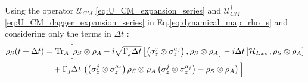 \documentclass[a4paper,12pt]{article}
\begin{document}
	Using the operator $ \mathcal{U}_{CM} $ \ref{eq:U_CM_expansion_series} and $ \mathcal{U}_{CM}^{\dagger} $ \ref{eq:U_CM_dagger_expansion_series} in Eq.\ref{eq:dynamical_map_rho_s} and considering only the terms in $ \Delta t $ :
	\begin{align}
		\rho_{S}(t + \Delta t) &= \text{Tr}_A \Big[ \rho_{S} \otimes \rho_{A} - i \sqrt{\Gamma_j \Delta t} \left[ \left( \sigma_{z}^{j} \otimes \sigma_{z}^{a_j} \right) , \rho_{S} \otimes \rho_{A} \right] -i \Delta t \left[ \mathcal{H}_{Exc} \, , \rho_{S} \otimes \rho_{A} \right] \notag \\
		& \quad + \Gamma_{j} \Delta t \, \left( \left( \sigma_{z}^{j} \otimes \sigma_{z}^{a_j} \right) \rho_{S} \otimes \rho_{A} \left( \sigma_{z}^{j} \otimes \sigma_{z}^{a_j} \right) - \rho_{S} \otimes \rho_{A}  \right)  \Big]
		\label{eq:complete_rho_evo_diff_cohe}
	\end{align}
\end{document}
